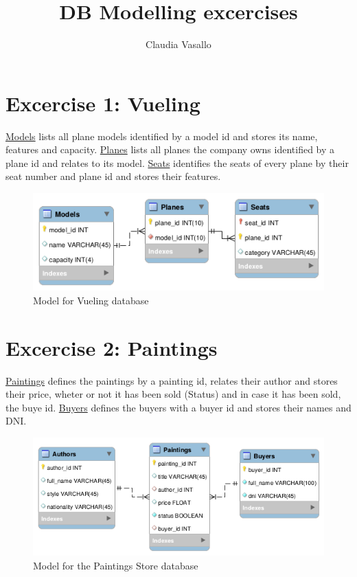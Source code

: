 \documentclass{article}
\title{DB Modelling excercises}
\author{Claudia Vasallo}
\date{}
\begin{document}
\maketitle

\section{Excercise 1: Vueling}
\underline{Models} lists all plane models identified by a model id and stores its name, features and capacity. \underline{Planes} lists all planes the company owns identified by a plane id and relates to its model. \underline{Seats} identifies the seats of every plane by their seat number and plane id and stores their features.
\begin{figure}[h!]
 \centering
  \includegraphics[width=0.8\linewidth]{vueling.png}
  \caption{Model for Vueling database}
  \label{fig:Vueling DB}
\end{figure}

\section{Excercise 2: Paintings}
\underline{Paintings} defines the paintings by a painting id, relates their author and stores their price, wheter or not it has been sold (Status) and in case it has been sold, the buye id. \underline{Buyers} defines the buyers with a buyer id and stores their names and DNI. 
\begin{figure}[h!]
 \centering
  \includegraphics[width=0.8\linewidth]{paintings.png}
  \caption{Model for the Paintings Store database}
  \label{fig:Paintings Store DB}
\end{figure}
\end{document}
